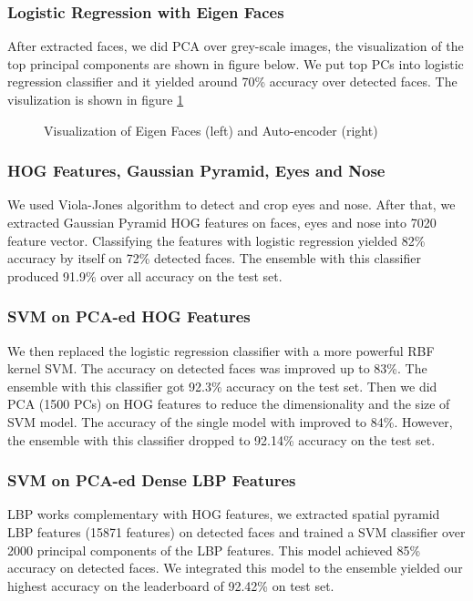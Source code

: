 \subsubsection{Logistic Regression with Eigen Faces}
After extracted faces, we did PCA over grey-scale images, the visualization of the top principal components are shown in figure below. We put top PCs into logistic regression classifier and it yielded around 70\% accuracy over detected faces. The visulization is shown in figure \ref{eigenfacesauto}\\
\begin{figure}
    \caption{Visualization of Eigen Faces (left) and Auto-encoder (right)} 
    \label{eigenfacesauto}
\end{figure}
\subsubsection{HOG Features, Gaussian Pyramid, Eyes and Nose}
We used Viola-Jones algorithm to detect and crop eyes and nose. After that, we extracted Gaussian Pyramid HOG features on faces, eyes and nose into 7020 feature vector. Classifying the features with logistic regression yielded 82\% accuracy by itself on 72\% detected faces. The ensemble with this classifier produced 91.9\% over all accuracy on the test set. 
\subsubsection{SVM on PCA-ed HOG Features}
We then replaced the logistic regression classifier with a more powerful RBF kernel SVM. The accuracy on detected faces was improved up to 83\%. The ensemble with this classifier got 92.3\% accuracy on the test set.  Then we did PCA (1500 PCs) on HOG features to reduce the dimensionality and the size of SVM model. The accuracy of the single model with improved to 84\%. However, the ensemble with this classifier dropped to 92.14\% accuracy on the test set. 
\subsubsection{SVM on PCA-ed Dense LBP Features}
LBP works complementary with HOG features, we extracted spatial pyramid LBP features (15871 features) on detected faces and trained a SVM classifier over 2000 principal components of the LBP features. This model achieved 85\% accuracy on detected faces. We integrated this model to the ensemble yielded our highest accuracy on the leaderboard of 92.42\% on test set.

